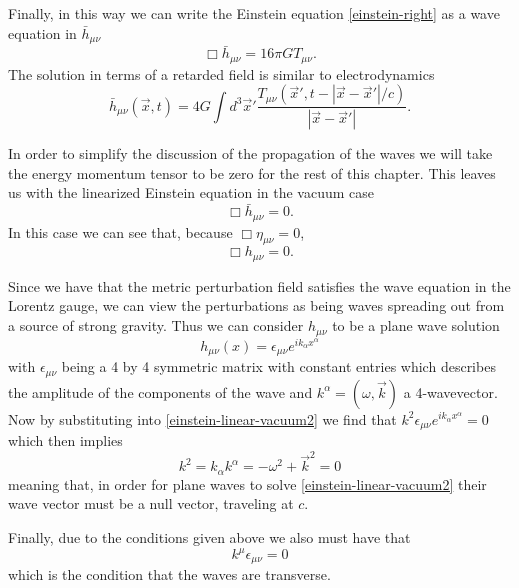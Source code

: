 Finally, in this way we can write the Einstein equation \eqref{einstein-right} as a wave equation in \(\bar{h}_{\mu \nu}\)
\begin{equation} \label{wave-equation}
	\Box \bar{h}_{\mu \nu} = 16 \pi G T_{\mu \nu} .
\end{equation}
The solution in terms of a retarded field is similar to electrodynamics \cite{cheng}
\begin{equation} \label{wave-solution}
	\bar{h}_{\mu \nu} (\vec{x}, t) = 4 G \int d^3 \vec{x}' \frac{T_{\mu \nu} (\vec{x}', t - |\vec{x}-\vec{x}'|/c)}{|\vec{x} - \vec{x}'|} .
\end{equation}

In order to simplify the discussion of the propagation of the waves we will take the energy momentum tensor to be zero for the rest of this chapter. This leaves us with the linearized Einstein equation in the vacuum case
\begin{equation} \label{einstein-linear-vacuum}
	\Box \bar{h}_{\mu \nu} = 0 .
\end{equation}
In this case we can see that, because \(\Box \eta_{\mu \nu} = 0\), 
\begin{equation} \label{einstein-linear-vacuum2}
	\Box h_{\mu \nu} = 0 .
\end{equation}

Since we have that the metric perturbation field satisfies the wave equation in the Lorentz gauge, we can view the perturbations as being waves spreading out from a source of strong gravity. Thus we can consider \(h_{\mu \nu}\) to be a plane wave solution \cite{cheng, hartle}
\begin{equation} \label{wave-solution2}
	h_{\mu \nu} (x) = \epsilon_{\mu \nu} e^{i k_{\alpha} x^{\alpha}}
\end{equation}
with \(\epsilon_{\mu \nu}\) being a 4 by 4 symmetric matrix with constant entries which describes the amplitude of the components of the wave and \(k^{\alpha} = ( \omega, \vec{k} )\) a 4-wavevector. Now by substituting into \eqref{einstein-linear-vacuum2} we find that \(k^2 \epsilon_{\mu \nu} e^{i k_{\alpha} x^{\alpha}} = 0\) which then implies \cite{carroll, hartle}
\begin{equation} \label{wave-null}
	k^2 = k_{\alpha} k^{\alpha} = - \omega^2 + \vec{k}^2 = 0
\end{equation}
meaning that, in order for plane waves to solve \eqref{einstein-linear-vacuum2} their wave vector must be a null vector, traveling at \(c\).

Finally, due to the conditions given above we also must have that \cite{cheng}
\begin{equation} \label{transverse}
	k^{\mu} \epsilon_{\mu \nu} = 0
\end{equation}
which is the condition that the waves are transverse.

